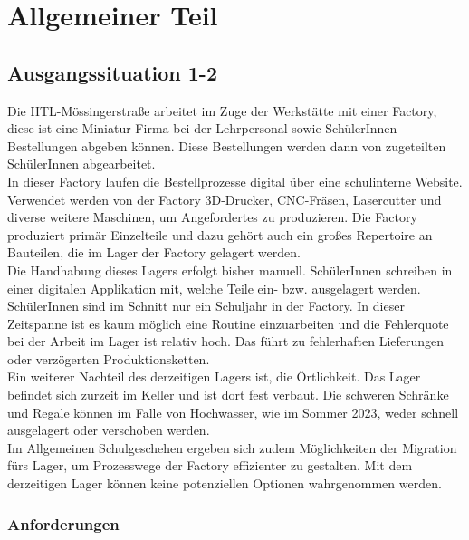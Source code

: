 \section{Allgemeiner Teil}

\subsection{Ausgangssituation 1-2}
Die HTL-Mössingerstraße arbeitet im Zuge der Werkstätte mit einer Factory, diese ist eine Miniatur-Firma bei der Lehrpersonal sowie SchülerInnen Bestellungen abgeben können. Diese Bestellungen werden dann von zugeteilten SchülerInnen abgearbeitet.\\
In dieser Factory laufen die Bestellprozesse digital über eine schulinterne Website. Verwendet werden von der Factory 3D-Drucker, CNC-Fräsen, Lasercutter und diverse weitere Maschinen, um Angefordertes zu produzieren. Die Factory produziert primär Einzelteile und dazu gehört auch ein großes Repertoire an Bauteilen, die im Lager der Factory gelagert werden.\\ 
Die Handhabung dieses Lagers erfolgt bisher manuell. SchülerInnen schreiben in einer digitalen Applikation mit, welche Teile ein- bzw. ausgelagert werden. SchülerInnen sind im Schnitt nur ein Schuljahr in der Factory. In dieser Zeitspanne ist es kaum möglich eine Routine einzuarbeiten und die Fehlerquote bei der Arbeit im Lager ist relativ hoch. Das führt zu fehlerhaften Lieferungen oder verzögerten Produktionsketten.\\
Ein weiterer Nachteil des derzeitigen Lagers ist, die Örtlichkeit. Das Lager befindet sich zurzeit im Keller und ist dort fest verbaut. Die schweren Schränke und Regale können im Falle von Hochwasser, wie im Sommer 2023, weder schnell ausgelagert oder verschoben werden.\\ 
Im Allgemeinen Schulgeschehen ergeben sich zudem Möglichkeiten der Migration fürs Lager, um Prozesswege der Factory effizienter zu gestalten. Mit dem derzeitigen Lager können keine potenziellen Optionen wahrgenommen werden. 

\subsubsection{Anforderungen}

